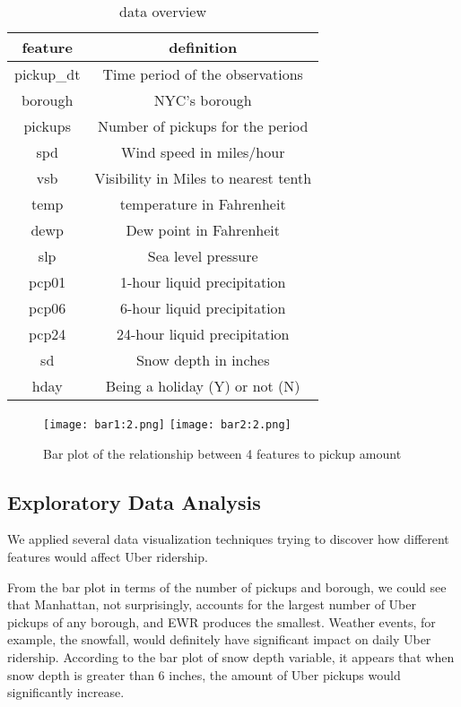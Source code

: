 \documentclass[article, 10 pt, conference]{ieeeconf}
\begin{document}
\begin{table}[h]
\caption{data overview}
\label{tab:data}
\begin{center}
\begin{tabular}{|c|c|}
\hline
feature & definition\\
\hline
\hline
pickup\_dt & Time period of the observations\\
\hline 
borough & NYC's borough\\
\hline pickups& Number of pickups for the period\\
\hline spd& Wind speed in miles/hour\\
\hline vsb& Visibility in Miles to nearest tenth\\
\hline temp& temperature in Fahrenheit\\
\hline dewp& Dew point in Fahrenheit\\
\hline slp& Sea level pressure\\
\hline pcp01& 1-hour liquid precipitation\\
\hline pcp06& 6-hour liquid precipitation\\
\hline pcp24& 24-hour liquid precipitation\\
\hline sd& Snow depth in inches\\
\hline hday& Being a holiday (Y) or not (N)\\
\hline
\end{tabular}
\end{center}
\end{table}


\begin{figure}[!h]
    \texttt{[image: bar1:2.png]}
    \texttt{[image: bar2:2.png]}
    \caption{Bar plot of the relationship between 4 features to pickup amount }
\end{figure}


\subsection{Exploratory Data Analysis}
We applied several data visualization techniques trying to discover how different features would affect Uber ridership.

From the bar plot in terms of the number of pickups and borough, we could see that Manhattan, not surprisingly, accounts for the largest number of Uber pickups of any borough, and EWR produces the smallest. Weather events, for example, the snowfall, would definitely have significant impact on daily Uber ridership. According to the bar plot of snow depth variable, it appears that when snow depth is greater than 6 inches, the amount of Uber pickups would significantly increase. 
\end{document}
